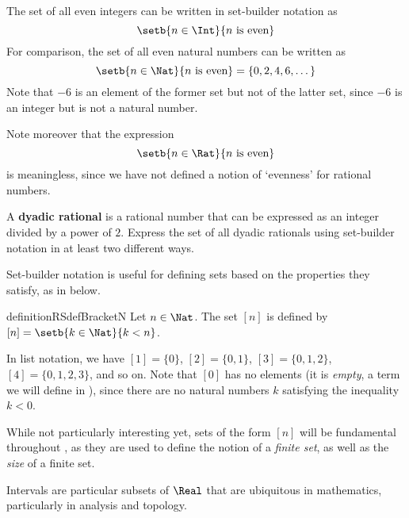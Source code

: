 \begin{example}
\label{exSetsSpecifyUniverses}
The set of all even integers can be written in set-builder notation as
\[ \setb{n \in \Int}{n \text{ is even}} \]
For comparison, the set of all even natural numbers can be written as
\[ \setb{n \in \Nat}{n \text{ is even}} = \{ 0, 2, 4, 6, \dots \} \]
Note that $-6$ is an element of the former set but not of the latter set, since $-6$ is an integer but is not a natural number.

Note moreover that the expression
\[ \setb{n \in \Rat}{n \text{ is even}} \]
is meaningless, since we have not defined a notion of `evenness' for rational numbers.
\end{example}


\begin{exercise}
\label{exDyadicRatioal}
A \textbf{dyadic rational} is a rational number that can be expressed as an integer divided by a power of $2$. Express the set of all dyadic rationals using set-builder notation in at least two different ways.
\end{exercise}

Set-builder notation is useful for defining sets based on the properties they satisfy, as in  below.

\begin{restatable}{definition}{RSdefBracketN}
\label{defBracketN}
Let $n \in \Nat$. The set $[n]$ is defined by $[n] = \setb{k \in \Nat}{k < n}$.
\end{restatable}

\begin{example}
\label{exBracketN}
In list notation, we have $[1] = \{ 0 \}$, $[2] = \{ 0, 1 \}$, $[3] = \{ 0, 1, 2 \}$, $[4] = \{ 0, 1, 2, 3 \}$, and so on. Note that $[0]$ has no elements (it is \textit{empty}, a term we will define in ), since there are no natural numbers $k$ satisfying the inequality $k < 0$.
\end{example}

While not particularly interesting yet, sets of the form $[n]$ will be fundamental throughout , as they are used to define the notion of a \textit{finite set}, as well as the \textit{size} of a finite set.

Intervals are particular subsets of $\Real$ that are ubiquitous in mathematics, particularly in analysis and topology.

